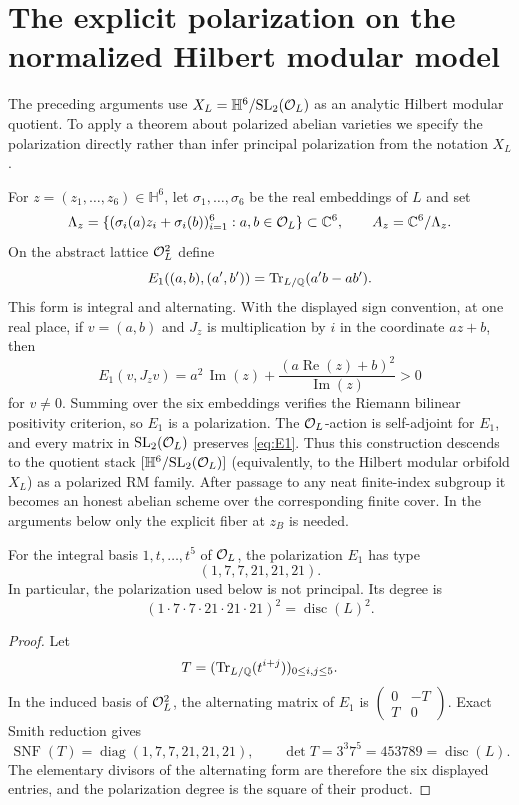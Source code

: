 \section{The explicit polarization on the normalized Hilbert modular model}\label{sec:polarization}
The preceding arguments use $X_L=\mathbb H^6/\mathrm{SL}_2(\mathcal O_L)$ as an analytic Hilbert modular quotient. To apply a theorem about polarized abelian varieties we specify the polarization directly rather than infer principal polarization from the notation $X_L$.

For $z=(z_1,\ldots,z_6)\in\mathbb H^6$, let $\sigma_1,\ldots,\sigma_6$ be the real embeddings of $L$ and set
\[
 \Lambda_z=\{(\sigma_i(a)z_i+\sigma_i(b))_{i=1}^6:a,b\in\mathcal O_L\}\subset\mathbb C^6,
 \qquad A_z=\mathbb C^6/\Lambda_z.
\]
On the abstract lattice $\mathcal O_L^2$ define
\begin{equation}\label{eq:E1}
 E_1((a,b),(a',b'))=\operatorname{Tr}_{L/\mathbb Q}(a'b-ab').
\end{equation}
This form is integral and alternating. With the displayed sign convention, at one real place, if $v=(a,b)$ and $J_z$ is multiplication by $i$ in the coordinate $az+b$, then
\[
 E_1(v,J_zv)=a^2\,\operatorname{Im}(z)+\frac{(a\operatorname{Re}(z)+b)^2}{\operatorname{Im}(z)}>0
\]
for $v\neq0$. Summing over the six embeddings verifies the Riemann bilinear positivity criterion, so $E_1$ is a polarization. The $\mathcal O_L$-action is self-adjoint for $E_1$, and every matrix in $\mathrm{SL}_2(\mathcal O_L)$ preserves \eqref{eq:E1}. Thus this construction descends to the quotient stack $[\mathbb H^6/\mathrm{SL}_2(\mathcal O_L)]$ (equivalently, to the Hilbert modular orbifold $X_L$) as a polarized RM family.  After passage to any neat finite-index subgroup it becomes an honest abelian scheme over the corresponding finite cover.  In the arguments below only the explicit fiber at $z_B$ is needed.

\begin{proposition}\label{prop:E1type}
For the integral basis $1,t,\ldots,t^5$ of $\mathcal O_L$, the polarization $E_1$ has type
\[
 \boxed{(1,7,7,21,21,21)}.
\]
In particular, the polarization used below is not principal. Its degree is
\[
 (1\cdot7\cdot7\cdot21\cdot21\cdot21)^2=\operatorname{disc}(L)^2.
\]
\end{proposition}
\begin{proof}
Let
\[
 T=(\operatorname{Tr}_{L/\mathbb Q}(t^{i+j}))_{0\le i,j\le5}.
\]
In the induced basis of $\mathcal O_L^2$, the alternating matrix of $E_1$ is
$\left(\begin{smallmatrix}0&-T\\T&0\end{smallmatrix}\right)$. Exact Smith reduction gives
\[
 \operatorname{SNF}(T)=\operatorname{diag}(1,7,7,21,21,21),
 \qquad \det T=3^3 7^5=453789=\operatorname{disc}(L).
\]
The elementary divisors of the alternating form are therefore the six displayed entries, and the polarization degree is the square of their product.
\end{proof}

